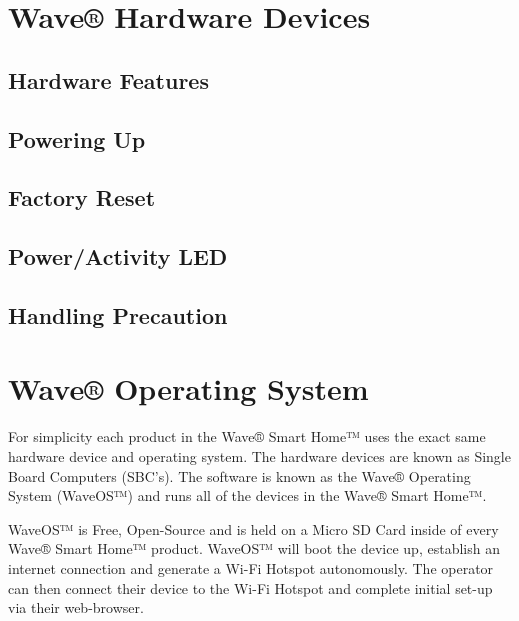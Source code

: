 \documentclass[letterpaper,10pt,english]{sphinxmanual}
\begin{document}
\section{Wave® Hardware Devices}
\label{\detokenize{introduction:wave-hardware-devices}}

\subsection{Hardware Features}
\label{\detokenize{introduction:hardware-features}}

\subsection{Powering Up}
\label{\detokenize{introduction:powering-up}}

\subsection{Factory Reset}
\label{\detokenize{introduction:factory-reset}}

\subsection{Power/Activity LED}
\label{\detokenize{introduction:power-activity-led}}

\subsection{Handling Precaution}
\label{\detokenize{introduction:handling-precaution}}



\section{Wave® Operating System}
\label{\detokenize{introduction:wave-operating-system}}
For simplicity each product in the Wave® Smart Home™ uses the exact same hardware device and operating system.
The hardware devices are known as Single Board Computers (SBC’s).
The  software is known as the Wave® Operating System (WaveOS™) and runs all of the devices in the Wave® Smart Home™.

WaveOS™ is Free, Open-Source and is held on a Micro SD Card inside of every Wave® Smart Home™ product.
WaveOS™ will boot the device up, establish an internet connection and generate a Wi-Fi Hotspot autonomously.
The operator can then connect their device to the Wi-Fi Hotspot and complete initial set-up via their web-browser.
\end{document}
